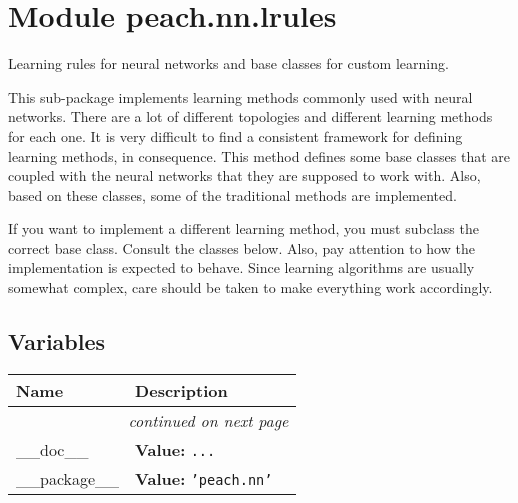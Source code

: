 %
%
%


\section{Module peach.nn.lrules}

    \label{peach:nn:lrules}

Learning rules for neural networks and base classes for custom learning.

This sub-package implements learning methods commonly used with neural networks.
There are a lot of different topologies and different learning methods for each
one. It is very difficult to find a consistent framework for defining learning
methods, in consequence. This method defines some base classes that are coupled
with the neural networks that they are supposed to work with. Also, based on
these classes, some of the traditional methods are implemented.

If you want to implement a different learning method, you must subclass the
correct base class. Consult the classes below. Also, pay attention to how the
implementation is expected to behave. Since learning algorithms are usually
somewhat complex, care should be taken to make everything work accordingly.


  \subsection{Variables}

    \vspace{-1cm}
\hspace{\varindent}\begin{longtable}{|p{\varnamewidth}|p{\vardescrwidth}|l}
\cline{1-2}
\cline{1-2} \centering \textbf{Name} & \centering \textbf{Description}& \\
\cline{1-2}
\endhead\cline{1-2}\multicolumn{3}{r}{\small\textit{continued on next page}}\\\endfoot\cline{1-2}
\endlastfoot\raggedright \_\-\_\-d\-o\-c\-\_\-\_\- & \raggedright \textbf{Value:} 
{\tt \texttt{...}}&\\
\cline{1-2}
\raggedright \_\-\_\-p\-a\-c\-k\-a\-g\-e\-\_\-\_\- & \raggedright \textbf{Value:} 
{\tt \texttt{'}\texttt{peach.nn}\texttt{'}}&\\
\cline{1-2}
\end{longtable}


